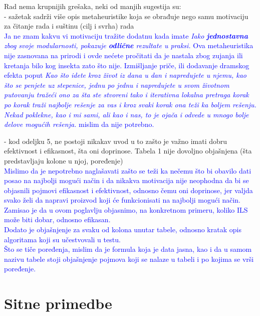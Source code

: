 \documentclass[a4paper]{report}
\newcommand{\odgovor}[1]{\textcolor{blue}{#1}}
\begin{document}
Rad nema krupnijih grešaka, neki od manjih sugestija su:\\
- sažetak sadrži više opis metaheuristike koja se obrađuje nego samu motivaciju za čitanje rada i suštinu (cilj i svrha) rada\\
\odgovor{Ja ne znam kakvu vi motivaciju tražite dodatnu kada imate \textit{Iako \textbf{jednostavna} zbog svoje modularnosti, pokazuje \textbf{odlične} rezultate u praksi.} Ova metaheuristika nije zasnovana na prirodi i ovde nećete pročitati 
da je nastala zbog zujanja ili kretanja bilo kog insekta zato što nije. Izmišljanje priče, ili dodavanje dramskog efekta poput \textit{Kao što idete kroz život iz dana u dan i napredujete u njemu, kao što se penjete uz stepenice, jednu po jednu i napredujete u svom životnom putovanju tražeći ono za šta ste stvoreni tako i iterativna lokalna pretraga korak po korak traži najbolje rešenje za vas i kroz 
svaki korak ona teži ka boljem rešenju. Nekad poklekne, kao i mi sami, ali kao i nas, to je ojača i odvede u mnogo bolje delove mogućih rešenja.} mislim da nije potrebno.\\}

- kod odeljku 5, ne postoji nikakav uvod u to zašto je važno imati dobru efektivnost i efikasnost, šta oni doprinose. Tabela 1 nije dovoljno objašnjena (šta predstavljaju kolone u njoj, poređenje) \\
\odgovor{Mislimo da je nepotrebno naglašavati zašto se teži ka nečemu što bi obavilo dati posao na najbolji mogući način i da nikakva motivacija nije neophodna da bi se objasnili pojmovi efikasnost i efektivnost, odnosno čemu oni doprinose, jer valjda svako želi da napravi proizvod koji će funkcionisati na najbolji mogući način. Zamisao je da u ovom poglavlju objasnimo, na konkretnom primeru, koliko ILS može biti dobar, odnosno efikasan.\\
Dodato je objašnjenje za svaku od kolona unutar tabele, odnosno kratak opis algoritama koji su učestvovali u testu.\\
Što se tiče poređenja, mislim da je formula koja je data jasna, kao i da u samom nazivu tabele stoji objašnjenje pojmova koji se nalaze u tabeli i po kojima se vrši poređenje.\\}


\section{Sitne primedbe}
\end{document}
